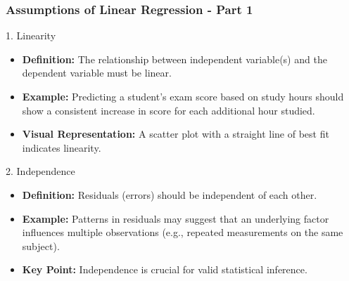 \documentclass[aspectratio=169]{beamer}
\begin{document}
\begin{frame}[fragile]
    \frametitle{Assumptions of Linear Regression - Part 1}
    \begin{block}{1. Linearity}
        \begin{itemize}
            \item \textbf{Definition:} The relationship between independent variable(s) and the dependent variable must be linear.
            \item \textbf{Example:} Predicting a student's exam score based on study hours should show a consistent increase in score for each additional hour studied.
            \item \textbf{Visual Representation:} A scatter plot with a straight line of best fit indicates linearity.
        \end{itemize}
    \end{block}

    \begin{block}{2. Independence}
        \begin{itemize}
            \item \textbf{Definition:} Residuals (errors) should be independent of each other.
            \item \textbf{Example:} Patterns in residuals may suggest that an underlying factor influences multiple observations (e.g., repeated measurements on the same subject).
            \item \textbf{Key Point:} Independence is crucial for valid statistical inference.
        \end{itemize}
    \end{block}
\end{frame}
\end{document}
